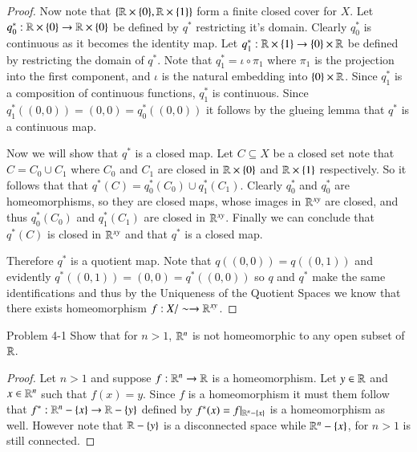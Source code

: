 \documentclass[minion]{homework651}
\begin{document}
\begin{problems}
\begin{proof}
        Now note that $\{\mathbb R\times\{0\}, \mathbb R\times\{1\}\}$ form a finite closed cover for $X$. Let $q^*_0:\mathbb R\times\{0\} \to \mathbb R\times \{0\}$ be defined by $q^*$
        restricting it's domain. Clearly $q^*_0$ is continuous as it becomes the identity map. Let $q^*_1:\mathbb R\times\{1\} \to \{0\}\times \mathbb R$ be defined by restricting the domain of $q^*$.
        Note that $q^*_1 = \iota \circ \pi_1 $ where $\pi_1$ is the projection into the first component, and $\iota$ is the natural embedding into $\{0\}\times \mathbb R$. Since $q^*_1$ is a composition of 
        continuous functions, $q^*_1$ is continuous. Since $q^*_1((0, 0)) = (0, 0) = q^*_0((0, 0))$ it follows by the glueing lemma that $q^*$ is a continuous map. 
   

        Now we will show that $q^*$ is a closed map. Let $C \subseteq X$ be a closed set note that $C = C_0 \cup C_1$ where $C_0$ and $C_1$ 
        are closed in $\mathbb R\times\{0\}$ and $\mathbb R\times\{1\}$ respectively. So it follows that that $q^*(C) = q^*_0(C_0) \cup q^*_1(C_1)$.  Clearly $q^*_0$ and $q^*_0$ are homeomorphisms, so they are closed maps, whose images in 
        $\mathbb R^{xy}$ are closed, and thus $q^*_0(C_0)$ and $q^*_1(C_1)$ are closed in $\mathbb R^{xy}$. Finally we can conclude that $q^*(C)$ is closed in $\mathbb R^{xy}$ and that $q^*$ is a closed map. 

        Therefore $q^*$ is a quotient map. Note that $q((0, 0)) = q((0, 1))$ and evidently $q^*((0, 1)) = (0, 0) = q^*((0, 0))$ so $q$ and $q^*$
        make the same identifications and thus by the Uniqueness of the Quotient Spaces we know that there exists homeomorphism $f:  X/\sim \to \mathbb R^{xy}$. 

    \end{proof}



    
    \problem Problem 4-1 Show that for $n > 1$, $\mathbb R^n$ is not homeomorphic to any open subset of $\mathbb R$. 
    \begin{proof}
       Let $n > 1$ and suppose $f: \mathbb R^n  \to \mathbb R$ is a homeomorphism. Let $y \in \mathbb R$ and $x \in \mathbb R^n$ such that $f(x) = y$. Since $f$
       is a homeomorphism it must them follow that $f^*: \mathbb R^n - \{x\} \to \mathbb R - \{y\}$ defined by $f^*(x) = f|_{\mathbb R^n - \{x\}}$ is a homeomorphism as well. 
       However note that $\mathbb R - \{y\}$ is a disconnected space while $\mathbb R^n - \{x\}$, for $n > 1$ is still connected. 
    \end{proof}
    

\end{problems}
\end{document}
